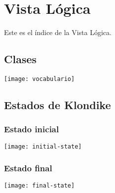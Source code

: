 \newpage
\section{Vista Lógica}
\paragraph{}
Este es el índice de la Vista Lógica.

\newpage
\subsection{Clases}
\texttt{[image: vocabulario]}

\newpage
\subsection{Estados de Klondike}
\subsubsection{Estado inicial}
\texttt{[image: initial-state]}

\newpage
\subsubsection{Estado final}
\texttt{[image: final-state]}
